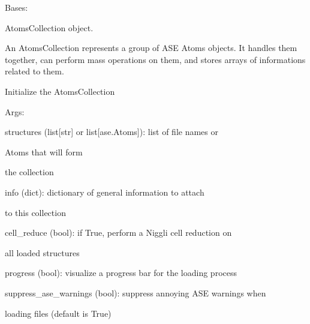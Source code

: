 \documentclass[letterpaper,10pt,english]{sphinxmanual}
\begin{document}
\begin{fulllineitems}
\label{doctree/soprano.collection.collection:soprano.collection.collection.AtomsCollection}
Bases: 

AtomsCollection object.

An AtomsCollection represents a group of ASE Atoms objects.
It handles them together, can perform mass operations on them, and stores
arrays of informations related to them.

Initialize the AtomsCollection

\begin{DUlineblock}{0em}
\item[] Args:
\item[]
\begin{DUlineblock}{\DUlineblockindent}
\item[] structures (list{[}str{]} or list{[}ase.Atoms{]}): list of file names or
\item[]
\begin{DUlineblock}{\DUlineblockindent}
\item[] Atoms that will form
\item[] the collection
\end{DUlineblock}
\item[] info (dict): dictionary of general information to attach
\item[]
\begin{DUlineblock}{\DUlineblockindent}
\item[] to this collection
\end{DUlineblock}
\item[] cell\_reduce (bool): if True, perform a Niggli cell reduction on
\item[]
\begin{DUlineblock}{\DUlineblockindent}
\item[] all loaded structures
\end{DUlineblock}
\item[] progress (bool): visualize a progress bar for the loading process
\item[] suppress\_ase\_warnings (bool): suppress annoying ASE warnings when
\item[]
\begin{DUlineblock}{\DUlineblockindent}
\item[] loading files (default is True)
\end{DUlineblock}
\end{DUlineblock}
\end{DUlineblock}


\end{fulllineitems}
\end{document}
